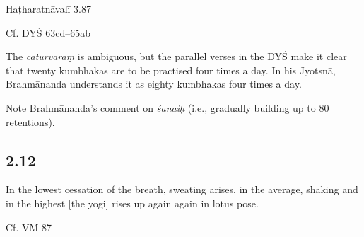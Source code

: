\begin{ekdosis}
\begin{sources}[hp02_011]
\end{sources}

\begin{testimonia}[hp02_011]
Haṭharatnāvalī 3.87

\begin{versinnote}
\end{versinnote}

Cf. DYŚ 63cd--65ab

\begin{versinnote}
\end{versinnote}
\end{testimonia}

\begin{philcomm}[hp02_011]
The \emph{caturvāraṃ} is ambiguous, but the parallel verses in the DYŚ make it clear that twenty kumbhakas are to be practised four times a day. In his Jyotsnā, Brahmānanda understands it as eighty kumbhakas four times a day.

Note Brahmānanda’s comment on \emph{śanaiḥ} (i.e., gradually building up to 80 retentions).

\end{philcomm}

\subsection*{2.12}
\begin{translation}[hp02_012]
In the lowest cessation of the breath, sweating arises, in the average, shaking and in the highest [the yogi] rises up again again in lotus pose.
\end{translation}

\begin{sources}[hp02_012]
Cf. VM 87

\begin{versinnote}
\end{versinnote}
\end{sources}


\end{ekdosis}
